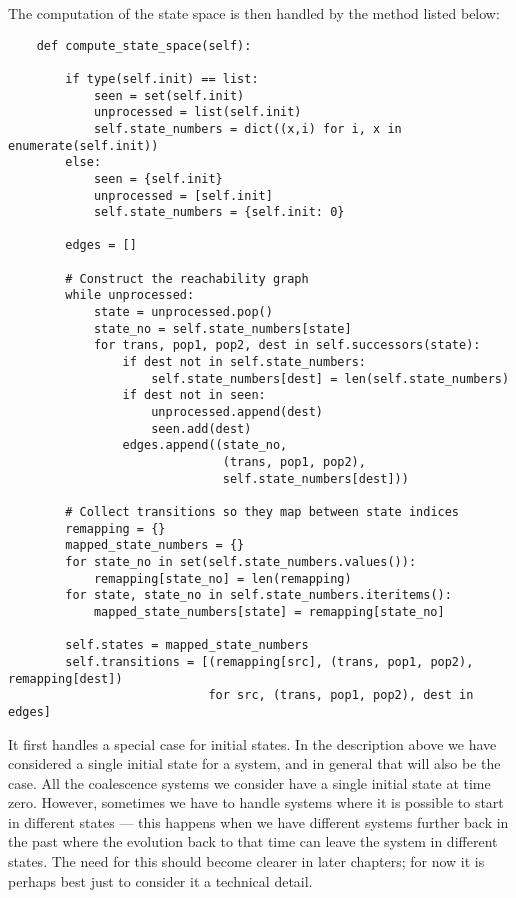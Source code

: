 \newpage %
The computation of the state space is then handled by the method listed below:
\begin{lstlisting}
    def compute_state_space(self):

        if type(self.init) == list:
            seen = set(self.init)
            unprocessed = list(self.init)
            self.state_numbers = dict((x,i) for i, x in enumerate(self.init))
        else:
            seen = {self.init}
            unprocessed = [self.init]
            self.state_numbers = {self.init: 0}

        edges = []

        # Construct the reachability graph
        while unprocessed:
            state = unprocessed.pop()
            state_no = self.state_numbers[state]
            for trans, pop1, pop2, dest in self.successors(state):
                if dest not in self.state_numbers:
                    self.state_numbers[dest] = len(self.state_numbers)
                if dest not in seen:
                    unprocessed.append(dest)
                    seen.add(dest)
                edges.append((state_no,
                              (trans, pop1, pop2),
                              self.state_numbers[dest]))

        # Collect transitions so they map between state indices
        remapping = {}
        mapped_state_numbers = {}
        for state_no in set(self.state_numbers.values()):
            remapping[state_no] = len(remapping)
        for state, state_no in self.state_numbers.iteritems():
            mapped_state_numbers[state] = remapping[state_no]

        self.states = mapped_state_numbers
        self.transitions = [(remapping[src], (trans, pop1, pop2), remapping[dest])
                            for src, (trans, pop1, pop2), dest in edges]

\end{lstlisting}

It first handles a special case for initial states. In the description above we have considered a single initial state for a system, and in general that will also be the case. All the coalescence systems we consider have a single initial state at time zero. However, sometimes we have to handle systems where it is possible to start in different states --- this happens when we have different systems further back in the past where the evolution back to that time can leave the system in different states. The need for this should become clearer in later chapters; for now it is perhaps best just to consider it a technical detail.


